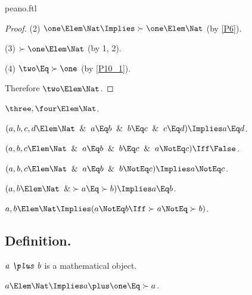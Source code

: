 \documentclass{stex}
\begin{document}
\begin{smodule}{peano.ftl}
\begin{forthel}
\begin{proof}
    (2) $\one \Elem \Nat \Implies \succ{\one} \Elem \Nat$ (by \ref{P6}).

    (3) $\succ{\one} \Elem \Nat$ (by 1, 2).

    (4) $\two \Eq \succ{\one}$ (by \ref{P10_1}).

    Therefore $\two \Elem \Nat$.
  \end{proof}

  \begin{theorem*}[title=12,id=P12]
    $\three,\four \Elem \Nat$.
  \end{theorem*}

  \begin{theorem*}[title=13,id=P13]
    $(a,b,c,d \Elem \Nat \And a \Eq b \And b \Eq c \And c \Eq d) \Implies a \Eq d$.
  \end{theorem*}

  \begin{theorem*}[title=14,id=P14]
    $(a,b,c \Elem \Nat \And a \Eq b \And b \Eq c \And a \NotEq c) \Iff \False$.
  \end{theorem*}

  \begin{theorem*}[title=15,id=P15]
    $(a,b,c \Elem \Nat \And a \Eq b \And b \NotEq c) \Implies a \NotEq c$.
  \end{theorem*}

  \begin{theorem*}[title=16,id=P16]
    $(a,b \Elem \Nat \And \succ{a} \Eq \succ{b}) \Implies a \Eq b$.
  \end{theorem*}

  \begin{theorem*}[title=17,id=P17]
    $a,b \Elem \Nat \Implies (a \NotEq b \Iff \succ{a} \NotEq \succ{b})$.
  \end{theorem*}
\end{forthel}


\subsection{Definition.}

\begin{forthel}
  \begin{signature*}
    $\emph{a \plus b}$ is a mathematical object.
  \end{signature*}

  \begin{axiom*}
    $a \Elem \Nat \Implies a \plus \one \Eq \succ{a}$.
  \end{axiom*}


\end{forthel}
\end{smodule}
\end{document}
